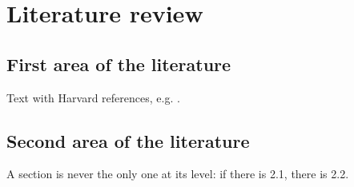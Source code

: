\chapter{Literature review}

\section{First area of the literature}
Text with Harvard references, e.g. \parencite[22]{Kowalski2011}.

\section{Second area of the literature}
A section is never the only one at its level: if there is 2.1, there is 2.2.
